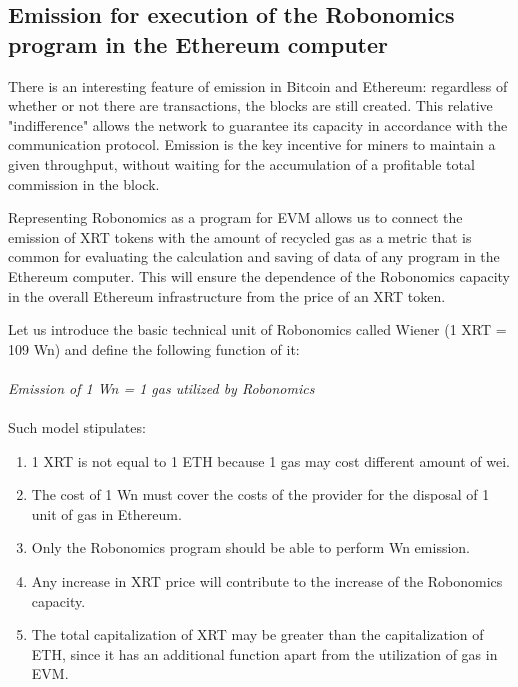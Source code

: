 \documentclass{article}
\begin{document}
\subsection{Emission for execution of the Robonomics program in the Ethereum computer}

There is an interesting feature of emission in Bitcoin and Ethereum: regardless of whether or not there are transactions, the blocks are still created. This relative "indifference" allows the network to guarantee its capacity in accordance with the communication protocol. Emission is the key incentive for miners to maintain a given throughput, without waiting for the accumulation of a profitable total commission in the block.
 
Representing Robonomics as a program for EVM allows us to connect the emission of XRT tokens with the amount of recycled gas as a metric that is common for evaluating the calculation and saving of data of any program in the Ethereum computer. This will ensure the dependence of the Robonomics capacity in the overall Ethereum infrastructure from the price of an XRT token.
 
Let us introduce the basic technical unit of Robonomics called Wiener (1 XRT = 109 Wn) and define the following function of it:
\\
\\
\textit{Emission of 1 Wn = 1 gas utilized by Robonomics}
\\
\\
Such model stipulates:
\begin{enumerate}
	\item 1 XRT is not equal to 1 ETH because 1 gas may cost different amount of wei.
	\item The cost of 1 Wn must cover the costs of the provider for the disposal of 1 unit of gas in Ethereum.
	\item Only the Robonomics program should be able to perform Wn emission.
	\item Any increase in XRT price will contribute to the increase of the Robonomics capacity.
	\item The total capitalization of XRT may be greater than the capitalization of ETH, since it has an additional function apart from the utilization of gas in EVM.
\end{enumerate}
\end{document}
